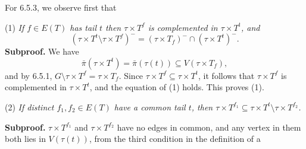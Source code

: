 For 6.5.3, we observe first that

\hspace*{12pt}(1) \textit{If $f \in E(T)$ has tail $t$ then $\tau \times T^f$ is complemented in $\tau \times T^t$, and}
\begin{equation*}
(\tau \times T^t \setminus \tau \times T^f)^- = (\tau \times T_f)^- \cap (\tau \times T^t)^-.
\end{equation*}
\textbf{Subproof.} We have
\begin{equation*}
\bar{\pi}(\tau \times T^t) = \bar{\pi}(\tau(t)) \subseteq V(\tau \times T_f),
\end{equation*}
and by 6.5.1, $G \setminus \tau \times T^f = \tau \times T_f$. Since $\tau \times T^f \subseteq \tau \times T^t$, it follows that $\tau \times T^f$ is complemented in $\tau \times T^t$, and the equation of (1) holds. This proves (1).

\hspace*{12pt}(2) \textit{If distinct $f_1, f_2 \in E(T)$ have a common tail $t$, then $\tau \times T^{f_1} \subseteq \tau \times T^t \setminus \tau \times T^{f_2}$.}

\textbf{Subproof.} $\tau \times T^{f_1}$ and $\tau \times T^{f_2}$ have no edges in common, and any vertex in them both lies in $V(\tau(t))$, from the third condition in the definition of a
